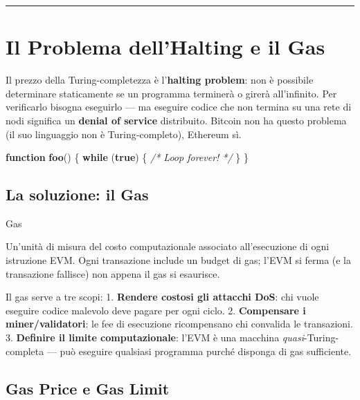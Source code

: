 \documentclass[
  italian,
  openany]{book}
\newenvironment{Shaded}{\begin{snugshade}}{\end{snugshade}}
\newcommand{\CommentTok}[1]{\textcolor[rgb]{0.56,0.35,0.01}{\textit{#1}}}
\newcommand{\ControlFlowTok}[1]{\textcolor[rgb]{0.13,0.29,0.53}{\textbf{#1}}}
\newcommand{\FunctionTok}[1]{\textcolor[rgb]{0.13,0.29,0.53}{\textbf{#1}}}
\newcommand{\KeywordTok}[1]{\textcolor[rgb]{0.13,0.29,0.53}{\textbf{#1}}}
\newcommand{\NormalTok}[1]{#1}
\begin{document}
\begin{center}\rule{0.5\linewidth}{0.5pt}\end{center}

\section{Il Problema dell'Halting e il
Gas}\label{il-problema-dellhalting-e-il-gas}

Il prezzo della Turing-completezza è l'\textbf{halting problem}: non è
possibile determinare staticamente se un programma terminerà o girerà
all'infinito. Per verificarlo bisogna eseguirlo --- ma eseguire codice
che non termina su una rete di nodi significa un \textbf{denial of
service} distribuito. Bitcoin non ha questo problema (il suo linguaggio
non è Turing-completo), Ethereum sì.

\begin{Shaded}
\begin{Highlighting}[]
\KeywordTok{function} \FunctionTok{foo}\NormalTok{() \{}
    \ControlFlowTok{while}\NormalTok{ (}\KeywordTok{true}\NormalTok{) \{ }\CommentTok{/* Loop forever! */}\NormalTok{ \}}
\NormalTok{\}}
\end{Highlighting}
\end{Shaded}

\subsection{La soluzione: il Gas}\label{la-soluzione-il-gas}

\begin{calloutdefinition}{Gas}

Un'unità di misura del costo computazionale associato all'esecuzione di
ogni istruzione EVM. Ogni transazione include un budget di gas; l'EVM si
ferma (e la transazione fallisce) non appena il gas si esaurisce.

\end{calloutdefinition}

Il gas serve a tre scopi: 1. \textbf{Rendere costosi gli attacchi DoS}:
chi vuole eseguire codice malevolo deve pagare per ogni ciclo. 2.
\textbf{Compensare i miner/validatori}: le fee di esecuzione
ricompensano chi convalida le transazioni. 3. \textbf{Definire il limite
computazionale}: l'EVM è una macchina \emph{quasi}-Turing-completa ---
può eseguire qualsiasi programma purché disponga di gas sufficiente.

\subsection{Gas Price e Gas Limit}\label{gas-price-e-gas-limit}
\end{document}
